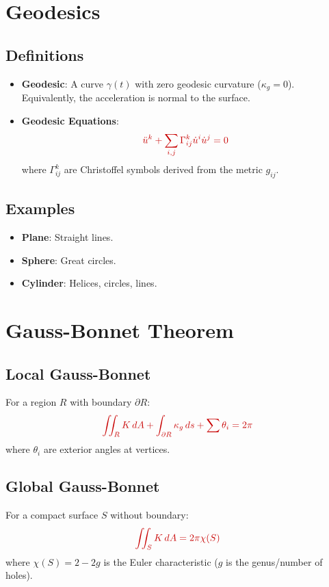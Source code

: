 \documentclass[a4paper,12pt]{article}
\newcommand{\key}[1]{\textcolor{keywordcolor}{\textbf{#1}}}
\newcommand{\formula}[1]{\textcolor{formulacolor}{#1}}
\begin{document}
\section{Geodesics}

\subsection{Definitions}
\begin{itemize}
    \item \key{Geodesic}: A curve $\gamma(t)$ with zero geodesic curvature ($\kappa_g = 0$). Equivalently, the acceleration is normal to the surface.
    \item \key{Geodesic Equations}:
    \begin{equation}
        \formula{\ddot{u}^k + \sum_{i,j} \Gamma_{ij}^k \dot{u}^i \dot{u}^j = 0}
    \end{equation}
    where $\Gamma_{ij}^k$ are Christoffel symbols derived from the metric $g_{ij}$.
\end{itemize}

\subsection{Examples}
\begin{itemize}
    \item \textbf{Plane}: Straight lines.
    \item \textbf{Sphere}: Great circles.
    \item \textbf{Cylinder}: Helices, circles, lines.
\end{itemize}

\section{Gauss-Bonnet Theorem}

\subsection{Local Gauss-Bonnet}
For a region $R$ with boundary $\partial R$:
\begin{equation}
    \formula{\iint_R K \, dA + \int_{\partial R} \kappa_g \, ds + \sum \theta_i = 2\pi}
\end{equation}
where $\theta_i$ are exterior angles at vertices.

\subsection{Global Gauss-Bonnet}
For a compact surface $S$ without boundary:
\begin{equation}
    \formula{\iint_S K \, dA = 2\pi \chi(S)}
\end{equation}
where $\chi(S) = 2 - 2g$ is the Euler characteristic ($g$ is the genus/number of holes).
\end{document}
